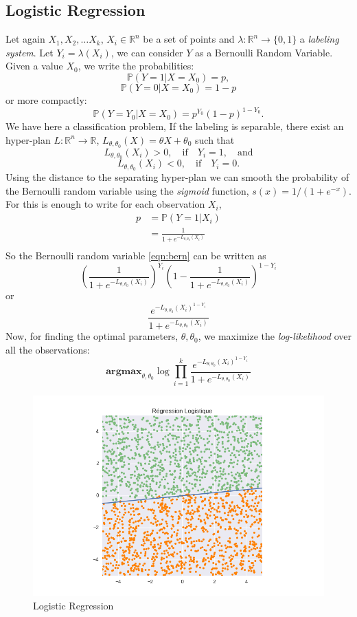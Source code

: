 \documentclass[DIV=calc, paper=a4, fontsize=11pt, twocolumn]{scrartcl}
\begin{document}
\subsection{Logistic Regression}
Let again $X_1, X_2, \ldots X_k$, $X_i \in \mathbb{R}^n$ be a set of points and $\lambda : \mathbb{R}^n \to \{0,1\}$ a \emph{labeling system}. Let $Y_i = \lambda(X_i)$, we can consider $Y$ as a Bernoulli Random Variable. Given a value $X_0$, we write the probabilities:
$$\mathbb{P}(Y=1| X = X_0) = p,$$
$$\mathbb{P}(Y=0| X = X_0) = 1-p$$
or more compactly:
\begin{equation}
\mathbb{P}(Y=Y_0| X = X_0) = p^{Y_0}(1-p)^{1-Y_0}.
\label{eqn:bern}
\end{equation}
We have here a classification problem, If the labeling is separable, there exist an hyper-plan $L: \mathbb{R}^n \to \mathbb{R}$, $L_{\theta, \theta_0}(X) = \theta X + \theta_0$ such that
$$ L_{\theta, \theta_0}(X_i) > 0, \quad \text{if} \quad Y_i = 1, \quad \text{and}$$
$$ L_{\theta, \theta_0}(X_i) < 0, \quad \text{if} \quad Y_i = 0.$$
Using the distance to the separating hyper-plan we can smooth the probability of the Bernoulli random variable using the \emph{sigmoid} function, $s(x) = 1/(1+ e^{-x})$. For this is enough to write for each observation $X_i$, 
\begin{align*}
p &= \mathbb{P}(Y=1|X_i)\\
                    &= \frac{1}{1+ e^{-L_{\theta, \theta_0}(X_i)}}\\
\end{align*}
So the Bernoulli random variable  \ref{eqn:bern} can be written as
$$\left( \frac{1}{1 + e^{-L_{\theta, \theta_0}(X_i) }} \right)^{Y_i} \left ( 1- \frac{1}{1 + e^{-L_{\theta, \theta_0}(X_i) }} \right)^{1 - Y_i} $$
or 
$$\frac{e^{-L_{\theta, \theta_0} (X_i)^{1-Y_i}}}{1 + e^{-L_{\theta, \theta_0}(X_i)}}$$
Now, for finding the optimal parameters, $\theta, \theta_0$, we maximize the \emph{log-likelihood} over all the observations:
$$\textbf{argmax}_{\theta, \theta_0}\log \prod_{i=1}^k \frac{e^{-L_{\theta, \theta_0} (X_i)^{1-Y_i}}}{1 + e^{-L_{\theta, \theta_0}(X_i)}}$$
\begin{figure}
  \centering
    \includegraphics[width=\linewidth]{reglog}
  \caption{Logistic Regression}
  \label{fig:reglog}
\end{figure}
\end{document}
